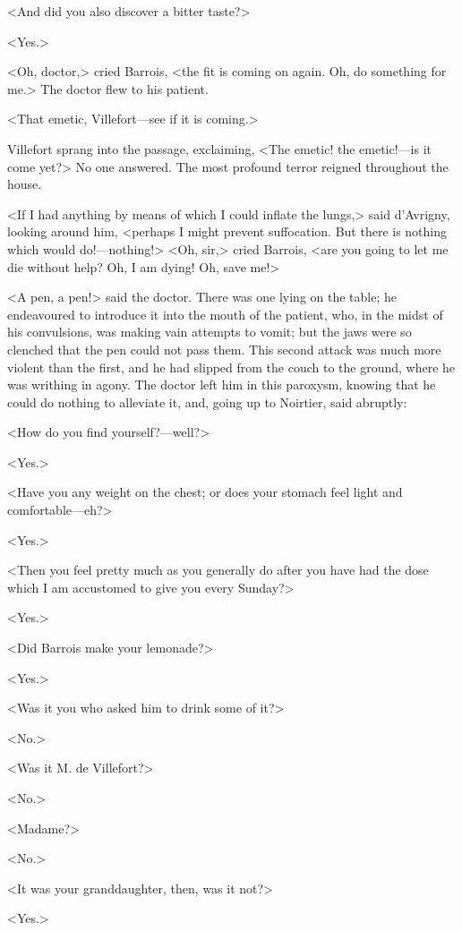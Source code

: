  <And did you also discover a bitter taste?> 

 <Yes.> 

 <Oh, doctor,> cried Barrois, <the fit is coming on again. Oh, do something for me.> The doctor flew to his patient. 

 <That emetic, Villefort—see if it is coming.> 

 Villefort sprang into the passage, exclaiming, <The emetic! the emetic!—is it come yet?> No one answered. The most profound terror reigned throughout the house. 

 <If I had anything by means of which I could inflate the lungs,> said d'Avrigny, looking around him, <perhaps I might prevent suffocation. But there is nothing which would do!—nothing!>  <Oh, sir,> cried Barrois, <are you going to let me die without help? Oh, I am dying! Oh, save me!> 

 <A pen, a pen!> said the doctor. There was one lying on the table; he endeavoured to introduce it into the mouth of the patient, who, in the midst of his convulsions, was making vain attempts to vomit; but the jaws were so clenched that the pen could not pass them. This second attack was much more violent than the first, and he had slipped from the couch to the ground, where he was writhing in agony. The doctor left him in this paroxysm, knowing that he could do nothing to alleviate it, and, going up to Noirtier, said abruptly: 

 <How do you find yourself?—well?> 

 <Yes.> 

 <Have you any weight on the chest; or does your stomach feel light and comfortable—eh?> 

 <Yes.> 

 <Then you feel pretty much as you generally do after you have had the dose which I am accustomed to give you every Sunday?> 

 <Yes.> 

 <Did Barrois make your lemonade?> 

 <Yes.> 

 <Was it you who asked him to drink some of it?> 

 <No.> 

 <Was it M. de Villefort?> 

 <No.> 

 <Madame?> 

 <No.> 

 <It was your granddaughter, then, was it not?> 

 <Yes.> 

